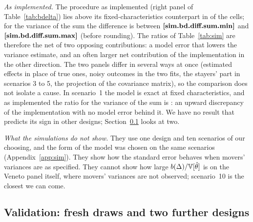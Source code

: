 \emph{As implemented.} The procedure as implemented (right panel of Table~\ref{tab:bdelta}) lies above its
fixed-characteristics counterpart in  of the  cells; for the variance of the
sum the difference is between $\R{sim.bd.diff.sum.min}$ and $\R{sim.bd.diff.sum.max}$ (before rounding). The
ratios of Table~\ref{tab:sim} are therefore the net of two opposing contributions: a model error that lowers the
variance estimate, and an often larger net contribution of the implementation in the other direction. The two
panels differ in several ways at once (estimated effects in place of true ones, noisy outcomes in the two fits,
the stayers' part in scenarios 3 to 5, the projection of the covariance matrix), so the comparison does not
isolate a cause. In scenario~1 the model is exact at fixed characteristics, and as implemented the ratio for
the variance of the sum is : an upward discrepancy of the implementation with no model error
behind it. We have no result that predicts its sign in other designs; Section~\ref{sec:validation} looks at
two.

\emph{What the simulations do not show.} They use one design and ten scenarios of our choosing, and the form of
the model was chosen on the same scenarios (Appendix~\ref{app:sim}). They show how the standard error behaves when
movers' variances are as specified. They cannot show how large $b(\Delta)/\mathbb{V}[\hat\theta]$ is on the Veneto panel
itself, where movers' variances are not observed; scenario~10 is the closest we can come.

\subsection{Validation: fresh draws and two further designs}\label{sec:validation}


